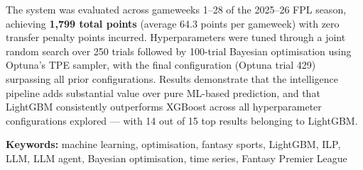 The system was evaluated across gameweeks 1--28 of the 2025--26 FPL season, achieving \textbf{1,799 total points} (average 64.3 points per gameweek) with zero transfer penalty points incurred. Hyperparameters were tuned through a joint random search over 250 trials followed by 100-trial Bayesian optimisation using Optuna's TPE sampler, with the final configuration (Optuna trial 429) surpassing all prior configurations. Results demonstrate that the intelligence pipeline adds substantial value over pure ML-based prediction, and that LightGBM consistently outperforms XGBoost across all hyperparameter configurations explored — with 14 out of 15 top results belonging to LightGBM.

\bigskip
\noindent\textbf{Keywords:} machine learning, optimisation, fantasy sports, LightGBM, ILP, LLM, LLM agent, Bayesian optimisation, time series, Fantasy Premier League

